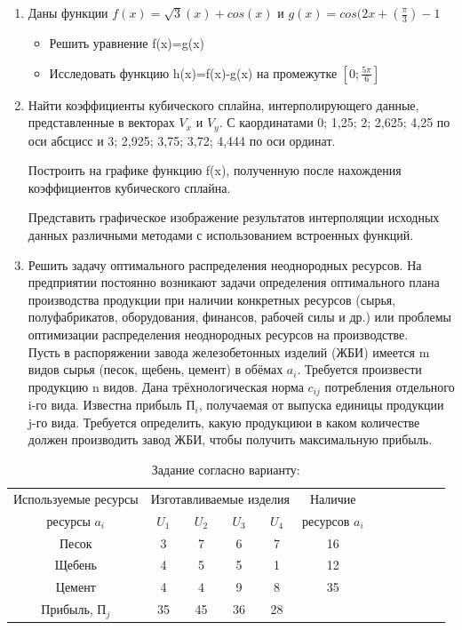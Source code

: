 \documentclass[russian,utf8,nocolumnxxxi,nocolumnxxxii]{eskdtext}
\begin{document}
\begin{enumerate}
\item Даны функции $f(x)=\sqrt{3}(x)+cos(x)$ и $g(x)=cos(2x+(\frac{\pi}{3})-1$
\begin{itemize}
  \item Решить уравнение f(x)=g(x)
  \item Исследовать функцию h(x)=f(x)-g(x) на промежутке $[0;\frac{5\pi}{6}]$
\end{itemize}
\item Найти коэффициенты кубического сплайна, интерполирующего данные, представленные в векторах $V_x$ и $V_y$. С каординатами  0; 1,25; 2; 2,625; 4,25 по оси абсцисс и 3; 2,925; 3,75; 3,72; 4,444 по оси ординат.%

Построить на графике функцию f(x), полученную после нахождения коэффициентов кубического сплайна.

Представить графическое изображение результатов интерполяции исходных данных различными методами с использованием встроенных функций.
\item Решить задачу оптимального распределения неоднородных ресурсов. На предприятии постоянно возникают задачи определения оптимального плана производства продукции при наличии конкретных ресурсов (сырья, полуфабрикатов, оборудования, финансов, рабочей силы и др.) или проблемы оптимизации распределения неоднородных ресурсов на производстве.
\\Пусть в распоряжении завода железобетонных изделий (ЖБИ) имеется m видов сырья (песок, щебень, цемент) в обёмах $a_i$. Требуется произвести продукцию n видов. Дана трёхнологическая норма $c_{ij}$ потребления отдельного i-го вида. Известна прибыль $П_i$, получаемая от выпуска единицы продукции j-го вида. Требуется определить, какую продукциюи  в каком количестве должен производить завод ЖБИ, чтобы получить максимальную прибыль.
\end{enumerate}
\begin{table}[h]
\caption{\label{TRT1} Задание согласно варианту:  }

\begin{tabular}{|c|c|c|c|c|c|c|c|c|c|c|c|}
\hline %

Используемые ресурсы &\multicolumn{4}{|c|}{Изготавливаемые изделия} & Наличие\\
ресурсы $a_i$ & $U_1$ & $U_2$ & $U_3$ & $U_4$ & ресурсов $a_i$\\

\hline
  Песок          & 3  & 7  & 6  & 7  & 16  \\
  Щебень         & 4  & 5  & 5  & 1  & 12  \\
  Цемент         & 4  & 4  & 9  & 8  & 35  \\
  Прибыль, П$_j$ & 35 & 45 & 36 & 28 &   \\
 \hline
\end{tabular}
\end{table} 
\end{document}
